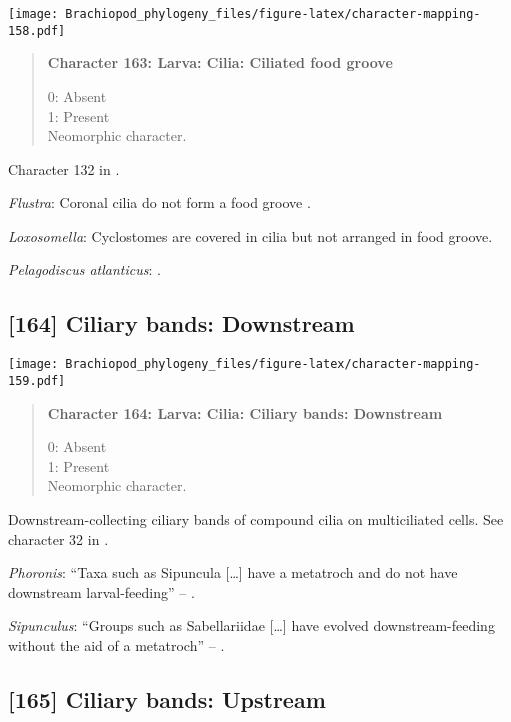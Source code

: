 \documentclass[openany]{book}
\theoremstyle{definition}
\theoremstyle{definition}
\theoremstyle{definition}
\theoremstyle{remark}
\begin{document}
\texttt{[image: Brachiopod\_phylogeny\_files/figure-latex/character-mapping-158.pdf]}

\begin{quote}
\textbf{Character 163: Larva: Cilia: Ciliated food groove}

0: Absent\\
1: Present\\
Neomorphic character.
\end{quote}

Character 132 in \citet{Rouse1999}.

\hypertarget{Flustra-coding-163}{}
\emph{Flustra}: Coronal cilia do not form a food groove
\citep{Reed1982}.

\hypertarget{Loxosomella-coding-163}{}
\emph{Loxosomella}: Cyclostomes are covered in cilia but not arranged in
food groove.

\hypertarget{Pelagodiscus_atlanticus-coding-163}{}
\emph{Pelagodiscus atlanticus}: \citet{Williams1997Introduction}.

\subsection*{{[}164{]} Ciliary bands:
Downstream}\label{ciliary-bands-downstream}

\texttt{[image: Brachiopod\_phylogeny\_files/figure-latex/character-mapping-159.pdf]}

\begin{quote}
\textbf{Character 164: Larva: Cilia: Ciliary bands: Downstream}

0: Absent\\
1: Present\\
Neomorphic character.
\end{quote}

Downstream-collecting ciliary bands of compound cilia on multiciliated
cells. See character 32 in \citet{Glenner2004}.

\hypertarget{Phoronis-coding-164}{}
\emph{Phoronis}: ``Taxa such as Sipuncula {[}\ldots{}{]} have a
metatroch and do not have downstream larval-feeding'' --
\citet{Rouse2000}.

\hypertarget{Sipunculus-coding-164}{}
\emph{Sipunculus}: ``Groups such as Sabellariidae {[}\ldots{}{]} have
evolved downstream-feeding without the aid of a metatroch'' --
\citep{Rouse2000}.

\subsection*{{[}165{]} Ciliary bands:
Upstream}\label{ciliary-bands-upstream}
\end{document}
